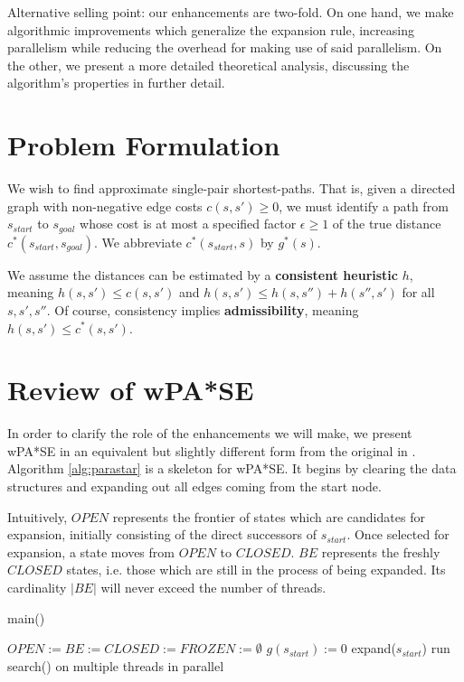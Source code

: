 \documentclass[letterpaper]{article}
\begin{document}
Alternative selling point: our enhancements are two-fold. On one hand, we make algorithmic improvements which generalize the expansion rule, increasing parallelism while reducing the overhead for making use of said parallelism. On the other, we present a more detailed theoretical analysis, discussing the algorithm's properties in further detail.

\section{Problem Formulation}

We wish to find approximate single-pair shortest-paths. That is, given a directed graph with non-negative edge costs $c(s,s') \ge 0$, we must identify a path from $s_{start}$ to $s_{goal}$ whose cost is at most a specified factor $\epsilon\ge 1$ of the true distance $c^*(s_{start},s_{goal})$. We abbreviate $c^*(s_{start}, s)$ by $g^*(s)$.

We assume the distances can be estimated by a \textbf{consistent heuristic} $h$, meaning $h(s,s')\le c(s,s')$ and $h(s,s')\le h(s,s'') + h(s'',s')$ for all $s,s',s''$. Of course, consistency implies \textbf{admissibility}, meaning $h(s,s')\le c^*(s,s')$.

\section{Review of wPA*SE}

In order to clarify the role of the enhancements we will make, we present wPA*SE in an equivalent but slightly different form from the original in \cite{asdf}. Algorithm \ref{alg:parastar} is a skeleton for wPA*SE. It begins by clearing the data structures and expanding out all edges coming from the start node.

Intuitively, $OPEN$ represents the frontier of states which are candidates for expansion, initially consisting of the direct successors of $s_{start}$. Once selected for expansion, a state moves from $OPEN$ to $CLOSED$. $BE$ represents the freshly $CLOSED$ states, i.e. those which are still in the process of being expanded. Its cardinality $|BE|$ will never exceed the number of threads.

\begin{algorithm}
\caption{main()}
\label{alg:parastar}
\begin{algorithmic}
\STATE $OPEN := BE := CLOSED := FROZEN := \emptyset$
\STATE $g(s_{start}) := 0$
\STATE expand($s_{start}$)
\STATE run search() on multiple threads in parallel
\end{algorithmic}
\end{algorithm}
\end{document}
